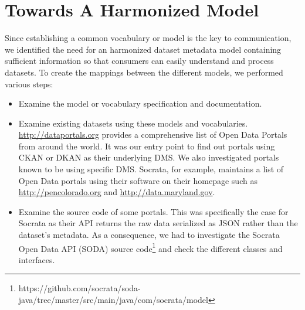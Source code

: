 \section{Towards A Harmonized Model}
\label{section:hdl}
Since establishing a common vocabulary or model is the key to communication, we identified the need for an harmonized dataset metadata model containing sufficient information so that consumers can easily understand and process datasets. To create the mappings between the different models, we performed various steps:
\begin{itemize}
  \item Examine the model or vocabulary specification and documentation.
  \item Examine existing datasets using these models and vocabularies. \url{http://dataportals.org} provides a comprehensive list of Open Data Portals from around the world. It was our entry point to find out portals using CKAN or DKAN as their underlying DMS. We also investigated portals known to be using specific DMS. Socrata, for example, maintains a list of Open Data portals using their software on their homepage such as \url{http://pencolorado.org} and \url{http://data.maryland.gov}.
  \item Examine the source code of some portals. This was specifically the case for Socrata as their API returns the raw data serialized as JSON rather than the dataset's metadata. As a consequence, we had to investigate the Socrata Open Data API (SODA) source code\footnote{https://github.com/socrata/soda-java/tree/master/src/main/java/com/socrata/model} and check the different classes and interfaces.
\end{itemize}


